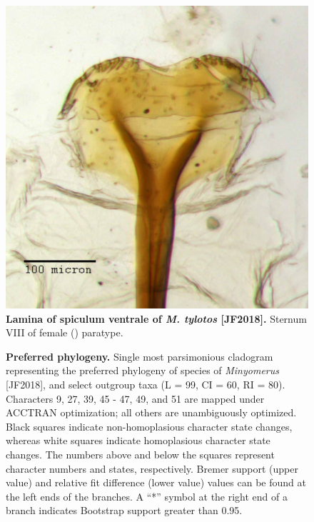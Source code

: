 \documentclass[fleqn,10pt,lineno]{wlpeerj} %
\begin{document}
\begin{figure}[h]
	\centering
	\includegraphics[width=\textwidth]{tylotos_lamina.jpg}
	\caption{\textbf{Lamina of spiculum ventrale of \textit{M. tylotos} [JF2018].} Sternum VIII of female (\female) paratype.}
	\label{fig:tylotos_lamina}
\end{figure}

\begin{figure}[h]
	\centering
	\begin{sideways}
	\end{sideways}
	\caption{\textbf{Preferred phylogeny.} Single most parsimonious cladogram representing the preferred phylogeny of species of \textit{Minyomerus} [JF2018], and select outgroup taxa (L = 99, CI = 60, RI = 80). Characters 9, 27, 39, 45 - 47, 49, and 51 are mapped under ACCTRAN optimization; all others are unambiguously optimized. Black squares indicate non-homoplasious character state changes, whereas white squares indicate homoplasious character state changes. The numbers above and below the squares represent character numbers and states, respectively. Bremer support (upper value) and relative fit difference (lower value) values can be found at the left ends of the branches. A ``*'' symbol at the right end of a branch indicates Bootstrap support greater than 0.95.}
	\label{fig:tree}
\end{figure}
\end{document}
